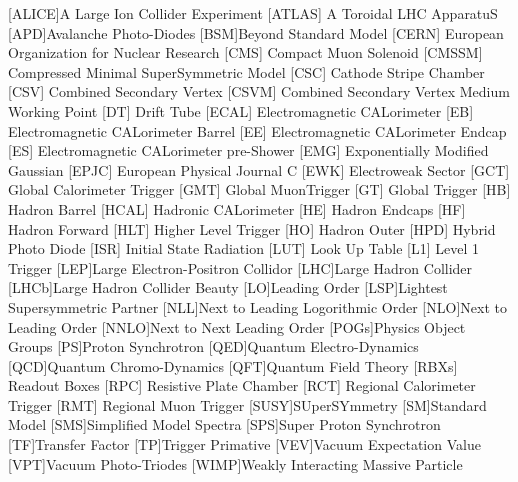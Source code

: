 \begin{acronym}[AAAAAAA]
[ALICE]{A Large Ion Collider Experiment}
 [ATLAS] {A Toroidal LHC ApparatuS}
[APD]{Avalanche Photo-Diodes}
[BSM]{Beyond Standard Model}
 [CERN] {European Organization for Nuclear Research}
 [CMS] {Compact Muon Solenoid}
 [CMSSM] {Compressed Minimal SuperSymmetric Model}
 [CSC] {Cathode Stripe Chamber}
 [CSV] {Combined Secondary Vertex}
 [CSVM] {Combined Secondary Vertex Medium Working Point}
 [DT] {Drift Tube}
 [ECAL] {Electromagnetic CALorimeter}
 [EB] {Electromagnetic CALorimeter Barrel}
 [EE] {Electromagnetic CALorimeter Endcap}
 [ES] {Electromagnetic CALorimeter pre-Shower}
 [EMG] {Exponentially Modified Gaussian}
 [EPJC] {European Physical Journal C}
 [EWK] {Electroweak Sector}
 [GCT] {Global Calorimeter Trigger}
 [GMT] {Global MuonTrigger}
 [GT] {Global Trigger}
 [HB] {Hadron Barrel}
 [HCAL] {Hadronic CALorimeter}
 [HE] {Hadron Endcaps}
 [HF] {Hadron Forward}
[HLT] {Higher Level Trigger}
 [HO] {Hadron Outer}
 [HPD] {Hybrid Photo Diode}
 [ISR] {Initial State Radiation}
 [LUT] {Look Up Table}
 [L1] {Level 1 Trigger}
[LEP]{Large Electron-Positron Collidor}
[LHC]{Large Hadron Collider}
[LHCb]{Large Hadron Collider Beauty}
[LO]{Leading Order}
[LSP]{Lightest Supersymmetric Partner}
[NLL]{Next to Leading Logorithmic Order}
[NLO]{Next to Leading Order}
[NNLO]{Next to Next Leading Order}
[POGs]{Physics Object Groups}
[PS]{Proton Synchrotron}
[QED]{Quantum Electro-Dynamics}
[QCD]{Quantum Chromo-Dynamics}
[QFT]{Quantum Field Theory}
 [RBXs] {Readout Boxes}
 [RPC] {Resistive Plate Chamber}
 [RCT] {Regional Calorimeter Trigger}
 [RMT] {Regional Muon Trigger}
[SUSY]{SUperSYmmetry}
[SM]{Standard Model}
[SMS]{Simplified Model Spectra}
[SPS]{Super Proton Synchrotron}
[TF]{Transfer Factor}
[TP]{Trigger Primative}
[VEV]{Vacuum Expectation Value}
[VPT]{Vacuum Photo-Triodes}
[WIMP]{Weakly Interacting Massive Particle}

\end{acronym}




